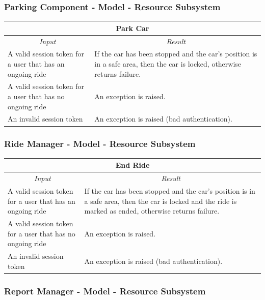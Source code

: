 \documentclass[english]{article}
\begin{document}
\subsubsection{Parking Component - Model - Resource Subsystem}

\begin{center}
	\begin{tabular}{ | p{6cm} | p{6cm} | }
		\hline 
		\multicolumn{2}{|c|}{\textbf{Park Car}} \\
		\hline
		\multicolumn{1}{|c|}{\textit{Input}} & \multicolumn{1}{c|}{\textit{Result}} \\
		\hline
		A valid session token for a user that has an ongoing ride  & If the car has been stopped and the car's position is in a safe area, then the car is locked, otherwise returns failure. \\
		\hline
		A valid session token for a user that has no ongoing ride &  An exception is raised. \\
		\hline
		An invalid session token & An exception is raised (bad authentication). \\
		\hline
	\end{tabular}
\end{center}

\subsubsection{Ride Manager - Model - Resource Subsystem}

\begin{center}
	\begin{tabular}{ | p{6cm} | p{6cm} | }
		\hline 
		\multicolumn{2}{|c|}{\textbf{End Ride}} \\
		\hline
		\multicolumn{1}{|c|}{\textit{Input}} & \multicolumn{1}{c|}{\textit{Result}} \\
		\hline
		A valid session token for a user that has an ongoing ride  & If the car has been stopped and the car's position is in a safe area, then the car is locked and the ride is marked as ended, otherwise returns failure. \\
		\hline
		A valid session token for a user that has no ongoing ride &  An exception is raised. \\
		\hline
		An invalid session token & An exception is raised (bad authentication). \\
		\hline
	\end{tabular}
\end{center}

\subsubsection{Report Manager - Model - Resource Subsystem}
\end{document}

